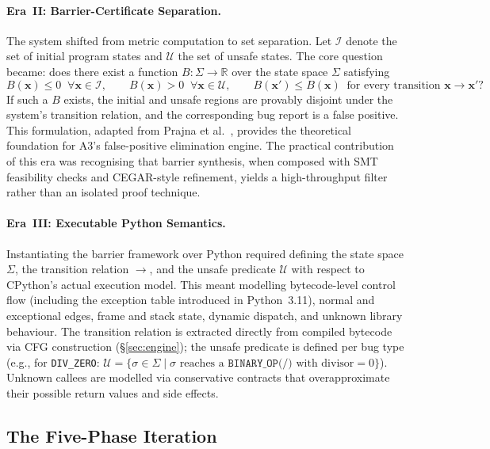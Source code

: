 \paragraph{Era~II: Barrier-Certificate Separation.}
The system shifted from metric computation to set separation.
Let $\mathcal{I}$ denote the set of initial program states and $\mathcal{U}$ the set of unsafe states.
The core question became: does there exist a function $B : \Sigma \to \mathbb{R}$ over the state space $\Sigma$ satisfying
\[
  B(\mathbf{x}) \leq 0 \;\;\forall \mathbf{x} \in \mathcal{I}, \qquad
  B(\mathbf{x}) > 0 \;\;\forall \mathbf{x} \in \mathcal{U}, \qquad
  B(\mathbf{x}') \leq B(\mathbf{x}) \;\;\text{for every transition } \mathbf{x} \to \mathbf{x}'?
\]
If such a $B$ exists, the initial and unsafe regions are provably disjoint under the system's transition relation, and the corresponding bug report is a false positive.
This formulation, adapted from Prajna et al.~\cite{prajna2004safety,prajna2007framework}, provides the theoretical foundation for \textsc{A3}'s false-positive elimination engine.
The practical contribution of this era was recognising that barrier synthesis, when composed with SMT feasibility checks and CEGAR-style refinement, yields a high-throughput filter rather than an isolated proof technique.

\paragraph{Era~III: Executable Python Semantics.}
Instantiating the barrier framework over Python required defining the state space $\Sigma$, the transition relation $\to$, and the unsafe predicate $\mathcal{U}$ with respect to CPython's actual execution model.
This meant modelling bytecode-level control flow (including the exception table introduced in Python~3.11), normal and exceptional edges, frame and stack state, dynamic dispatch, and unknown library behaviour.
The transition relation is extracted directly from compiled bytecode via CFG construction (\S\ref{sec:engine}); the unsafe predicate is defined per bug type (e.g., for \texttt{DIV\_ZERO}: $\mathcal{U} = \{\sigma \in \Sigma \mid \sigma \text{ reaches a } \texttt{BINARY\_OP(/)} \text{ with divisor} = 0\}$).
Unknown callees are modelled via conservative contracts that overapproximate their possible return values and side effects.

\subsection{The Five-Phase Iteration}

